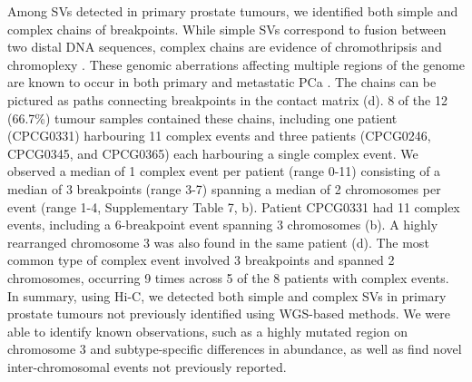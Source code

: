 
Among SVs detected in primary prostate tumours, we identified both simple and complex chains of breakpoints.
While simple SVs correspond to fusion between two distal DNA sequences, complex chains are evidence of chromothripsis and chromoplexy \cite{bacaPunctuatedEvolutionProstate2013}.
These genomic aberrations affecting multiple regions of the genome are known to occur in both primary and metastatic PCa \cite{bacaPunctuatedEvolutionProstate2013,fraserGenomicHallmarksLocalized2017,liPatternsSomaticStructural2020}.
The chains can be pictured as paths connecting breakpoints in the contact matrix (d).
8 of the 12 (66.7\%) tumour samples contained these chains, including one patient (CPCG0331) harbouring 11 complex events and three patients (CPCG0246, CPCG0345, and CPCG0365) each harbouring a single complex event.
We observed a median of 1 complex event per patient (range 0-11) consisting of a median of 3 breakpoints (range 3-7) spanning a median of 2 chromosomes per event (range 1-4, Supplementary Table 7, b).
Patient CPCG0331 had 11 complex events, including a 6-breakpoint event spanning 3 chromosomes (b).
A highly rearranged chromosome 3 was also found in the same patient (d).
The most common type of complex event involved 3 breakpoints and spanned 2 chromosomes, occurring 9 times across 5 of the 8 patients with complex events.
In summary, using Hi-C, we detected both simple and complex SVs in primary prostate tumours not previously identified using WGS-based methods.
We were able to identify known observations, such as a highly mutated region on chromosome 3 and subtype-specific differences in abundance, as well as find novel inter-chromosomal events not previously reported.

